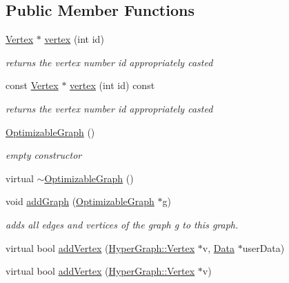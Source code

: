 \subsection*{Public Member Functions}
\begin{DoxyCompactItemize}
\item 
\hyperlink{classg2o_1_1OptimizableGraph_1_1Vertex}{Vertex} $\ast$ \hyperlink{structg2o_1_1OptimizableGraph_a19e014e8ec2e9a6e894da8c3a8f8e50d}{vertex} (int id)
\begin{DoxyCompactList}\small\item\em returns the vertex number {\itshape id} appropriately casted \end{DoxyCompactList}\item 
const \hyperlink{classg2o_1_1OptimizableGraph_1_1Vertex}{Vertex} $\ast$ \hyperlink{structg2o_1_1OptimizableGraph_a50323fa9906f5018a2be3affc61fc0d7}{vertex} (int id) const 
\begin{DoxyCompactList}\small\item\em returns the vertex number {\itshape id} appropriately casted \end{DoxyCompactList}\item 
\hyperlink{structg2o_1_1OptimizableGraph_acc459c08fd5e743cf2072e740ffc5025}{Optimizable\+Graph} ()
\begin{DoxyCompactList}\small\item\em empty constructor \end{DoxyCompactList}\item 
virtual \hyperlink{structg2o_1_1OptimizableGraph_a98f4399dfc23cac840a64ae2d0d3898f}{$\sim$\+Optimizable\+Graph} ()
\item 
void \hyperlink{structg2o_1_1OptimizableGraph_acea1342d9ab0bf717710c8f78b74ff25}{add\+Graph} (\hyperlink{structg2o_1_1OptimizableGraph}{Optimizable\+Graph} $\ast$g)
\begin{DoxyCompactList}\small\item\em adds all edges and vertices of the graph {\itshape g} to this graph. \end{DoxyCompactList}\item 
virtual bool \hyperlink{structg2o_1_1OptimizableGraph_ae0b93774ce1dfa0dfd501c86ad4f773e}{add\+Vertex} (\hyperlink{classg2o_1_1HyperGraph_1_1Vertex}{Hyper\+Graph\+::\+Vertex} $\ast$v, \hyperlink{classg2o_1_1OptimizableGraph_1_1Data}{Data} $\ast$user\+Data)
\item 
virtual bool \hyperlink{structg2o_1_1OptimizableGraph_ac6f41f49fe6148fbe17133d10bf29b4c}{add\+Vertex} (\hyperlink{classg2o_1_1HyperGraph_1_1Vertex}{Hyper\+Graph\+::\+Vertex} $\ast$v)

\end{DoxyCompactItemize}
